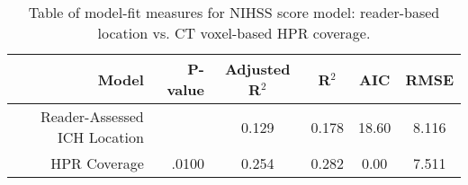 \begin{table}[H]
\centering
\begin{tabular}{rr|cccc}
  \hline
{\bf Model} & {\bf P-value} & {\bf Adjusted R$^2$} & {\bf R$^2$} & {\bf AIC} & {\bf RMSE} \\ 
  \hline
Reader-Assessed ICH Location &  & 0.129 & 0.178 & 18.60 & 8.116 \\ 
  HPR Coverage & .0100 & 0.254 & 0.282 & 0.00 & 7.511 \\ 
   \hline
\end{tabular}
\caption{Table of model-fit measures for NIHSS score model: reader-based location vs. CT voxel-based HPR coverage.} 
\label{t:nihss}
\end{table}
